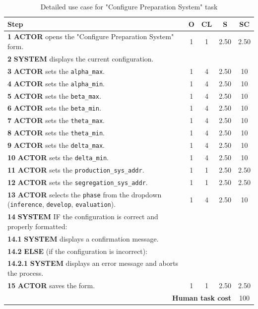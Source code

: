 \begin{table}[H]
    \centering
    \begin{tabularx}{\textwidth}{|X|c|c|c|c|}
    \hline
    \textbf{Step} & \textbf{O} & \textbf{CL} & \textbf{S} & \textbf{SC} \\
    \hline
    \textbf{1} \textbf{ACTOR} opens the "Configure Preparation System" form. & 1 & 1 & 2.50 & 2.50 \\
    \hline
    \textbf{2} \textbf{SYSTEM} displays the current configuration. &  &  &  &  \\
    \hline
    \textbf{3} \textbf{ACTOR} sets the \texttt{alpha\_max}. & 1 & 4 & 2.50 & 10 \\
    \hline
    \textbf{4} \textbf{ACTOR} sets the \texttt{alpha\_min}. & 1 & 4 & 2.50 & 10 \\
    \hline
    \textbf{5} \textbf{ACTOR} sets the \texttt{beta\_max}. & 1 & 4 & 2.50 & 10 \\
    \hline
    \textbf{6} \textbf{ACTOR} sets the \texttt{beta\_min}. & 1 & 4 & 2.50 & 10 \\
    \hline
    \textbf{7} \textbf{ACTOR} sets the \texttt{theta\_max}. & 1 & 4 & 2.50 & 10 \\
    \hline
    \textbf{8} \textbf{ACTOR} sets the \texttt{theta\_min}. & 1 & 4 & 2.50 & 10 \\
    \hline
    \textbf{9} \textbf{ACTOR} sets the \texttt{delta\_max}. & 1 & 4 & 2.50 & 10 \\
    \hline
    \textbf{10} \textbf{ACTOR} sets the \texttt{delta\_min}. & 1 & 4 & 2.50 & 10 \\
    \hline
    \textbf{11} \textbf{ACTOR} sets the \texttt{production\_sys\_addr}. & 1 & 1 & 2.50 & 2.50 \\
    \hline
    \textbf{12} \textbf{ACTOR} sets the \texttt{segregation\_sys\_addr}. & 1 & 1 & 2.50 & 2.50 \\
    \hline
    \textbf{13} \textbf{ACTOR} selects the \texttt{phase} from the dropdown (\texttt{inference}, \texttt{develop}, \texttt{evaluation}). & 1 & 4 & 2.50 & 10 \\
    \hline
    \textbf{14} \textbf{SYSTEM} {IF} the configuration is correct and properly formatted: &  &  &  &  \\
    \hline
    \textbf{14.1} \textbf{SYSTEM} displays a confirmation message. & & & &  \\
    \hline
    \textbf{14.2} \textbf{ELSE} (if the configuration is incorrect): & & &  &  \\
    \hline
    \textbf{14.2.1} \textbf{SYSTEM} displays an error message and aborts the process. &  &  &  &  \\
    \hline
    \textbf{15} \textbf{ACTOR} saves the form. & 1 & 1 & 2.50 & 2.50 \\
    \hline
    \multicolumn{4}{|r|}{\textbf{Human task cost}} & 100 \\
    \hline
    \end{tabularx}
    \caption{Detailed use case for "Configure Preparation System" task}
    \label{table:configure_preparation_system}
    \end{table}
